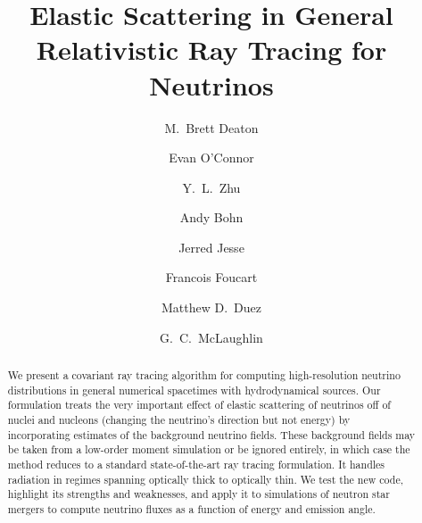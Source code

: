 \documentclass[aps,floatfix,prd,superscriptaddress,twocolumn]{revtex4-1}
\begin{document}
\widetext
{}

\title{Elastic Scattering in General Relativistic Ray Tracing for Neutrinos}

\author{M.\ Brett Deaton}

\author{Evan O'Connor}

\author{Y.\ L.\ Zhu}

\author{Andy Bohn}

\author{Jerred Jesse}

\author{Francois Foucart}

\author{Matthew D.\ Duez}

\author{G.\ C.\ McLaughlin}


\begin{abstract}
  We present a covariant ray tracing algorithm for computing high-resolution
  neutrino distributions in general numerical spacetimes with hydrodynamical
  sources.
  Our formulation treats the very important effect of
  elastic scattering of neutrinos off of nuclei and nucleons
  (changing the neutrino's direction but not energy)
  by incorporating estimates of the background neutrino fields.
  These background fields may be taken from a low-order moment simulation
  or be ignored entirely, in which case the method
  reduces to a standard state-of-the-art ray tracing formulation.
  It handles radiation in regimes spanning optically thick to optically thin.
  We test the new code, highlight its strengths and weaknesses, and
  apply it to simulations of neutron star mergers to
  compute neutrino fluxes as a function of energy and emission angle.
\end{abstract}
\end{document}
